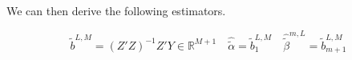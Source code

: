 \documentclass[11pt,twoside,a4paper]{article}
\begin{document}
	We can then derive the following estimators.
	
	\begin{equation}
		\tilde{b}^{L,M} = \left(Z'Z\right)^{-1}Z'Y \in \mathbb{R}^{M+1} \quad \hat{\tilde{\alpha}} = \tilde{b}_{1}^{L,M} \quad \hat{\tilde{\beta}}^{m,L} = \tilde{b}^{L,M}_{m+1}
	\end{equation}

\end{document}
